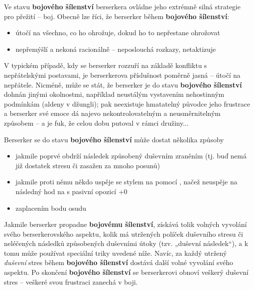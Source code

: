\documentclass[../main.tex]{subfiles}
\begin{document}
Ve stavu \textbf{bojového šílenství} berserkera ovládne jeho extrémně silná strategie pro přežití – boj. Obecně lze říci, že berserker během \textbf{bojového šílenství}:

\begin{itemize}
\item útočí na všechno, co ho ohrožuje, dokud ho to nepřestane ohrožovat
\item nepřemýšlí a nekoná racionálně – neposlouchá rozkazy, netaktizuje
\end{itemize}
V typickém případě, kdy se berserker rozzuří na základě konfliktu s nepřátelskými postavami, je berserkerova příslušnost poměrně jasná – útočí na nepřátele. Nicméně, může se stát, že berserker je do stavu \textbf{bojového šílenství} dohnán jinými okolnostmi, například neustálým vystavením nehostinným podmínkám (aldeny v džungli); pak neexistuje hmatatelný původce jeho frustrace a berserker své emoce dá najevo nekontrolovatelným a neusměrnitelným způsobem – a je fuk, že celou dobu putoval v rámci družiny...

Berserker se do stavu \textbf{bojového šílenství} může dostat několika způsoby
\begin{itemize}
\item jakmile poprvé obdrží následek způsobený duševním zraněním (tj. buď nemá již dostatek stresu či zasažen za mnoho posunů)
\item jakmile proti němu někdo uspěje se stylem na  pomocí , načež neuspěje na následný hod na  s pasivní opozicí +0
\item zaplacením bodu osudu
\end{itemize}

Jakmile berserker propadne \textbf{bojovému šílenství}, získává tolik volných vyvolání svého berserkerovského aspektu, kolik má utržených políček duševního stresu či neléčených následků způsobených duševními útoky (tzv. „duševní následek“), a k tomu může používat speciální triky uvedené níže. Navíc, za každý utržený \textit{duševní} stres během \textbf{bojového šílenství} dostává další volné vyvolání svého aspektu. Po skončení \textbf{bojového šílenství} se berserkerovi obnoví veškerý duševní stres – veškeré svou frustraci zanechá v boji.
\end{document}
